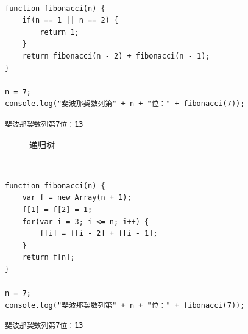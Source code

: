 \\

\begin{lstlisting}[style=htmlcssjs]
function fibonacci(n) {
    if(n == 1 || n == 2) {
        return 1;
    }
    return fibonacci(n - 2) + fibonacci(n - 1);
}

n = 7;
console.log("斐波那契数列第" + n + "位：" + fibonacci(7));
\end{lstlisting}

\begin{tcolorbox}
	\begin{verbatim}
斐波那契数列第7位：13
	\end{verbatim}
\end{tcolorbox}

\begin{figure}[H]
	\centering
	\caption{递归树}
\end{figure}

 \\

\begin{lstlisting}[style=htmlcssjs]
function fibonacci(n) {
    var f = new Array(n + 1);
    f[1] = f[2] = 1;
    for(var i = 3; i <= n; i++) {
        f[i] = f[i - 2] + f[i - 1];
    }
    return f[n];
}

n = 7;
console.log("斐波那契数列第" + n + "位：" + fibonacci(7));
\end{lstlisting}

\begin{tcolorbox}
	\begin{verbatim}
斐波那契数列第7位：13
	\end{verbatim}
\end{tcolorbox}

